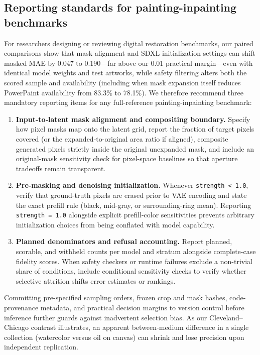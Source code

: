\documentclass[applsci,article,submit,pdftex,moreauthors]{Definitions/mdpi}
\providecommand{\tightlist}{\setlength{\itemsep}{0pt}\setlength{\parskip}{0pt}}
\begin{document}
\subsection{Reporting standards for painting-inpainting benchmarks}\label{reporting-standards-for-painting-inpainting-benchmarks}

For researchers designing or reviewing digital restoration benchmarks, our paired comparisons show that mask alignment and SDXL initialization settings can shift masked MAE by 0.047 to 0.190---far above our 0.01 practical margin---even with identical model weights and test artworks, while safety filtering alters both the scored sample and availability (including when mask expansion itself reduces PowerPaint availability from 83.3\% to 78.1\%). We therefore recommend three mandatory reporting items for any full-reference painting-inpainting benchmark:

\begin{enumerate}
\def\labelenumi{\arabic{enumi}.}
\tightlist
\item
  \textbf{Input-to-latent mask alignment and compositing boundary.} Specify how pixel masks map onto the latent grid, report the fraction of target pixels covered (or the expanded-to-original area ratio if aligned), composite generated pixels strictly inside the original unexpanded mask, and include an original-mask sensitivity check for pixel-space baselines so that aperture tradeoffs remain transparent.
\item
  \textbf{Pre-masking and denoising initialization.} Whenever \texttt{strength\ \textless{}\ 1.0}, verify that ground-truth pixels are erased prior to VAE encoding and state the exact prefill rule (black, mid-gray, or surrounding-ring mean). Reporting \texttt{strength\ =\ 1.0} alongside explicit prefill-color sensitivities prevents arbitrary initialization choices from being conflated with model capability.
\item
  \textbf{Planned denominators and refusal accounting.} Report planned, scorable, and withheld counts per model and stratum alongside complete-case fidelity scores. When safety checkers or runtime failures exclude a non-trivial share of conditions, include conditional sensitivity checks to verify whether selective attrition shifts error estimates or rankings.
\end{enumerate}

Committing pre-specified sampling orders, frozen crop and mask hashes, code-provenance metadata, and practical decision margins to version control before inference further guards against inadvertent selection bias. As our Cleveland--Chicago contrast illustrates, an apparent between-medium difference in a single collection (watercolor versus oil on canvas) can shrink and lose precision upon independent replication.
\end{document}

